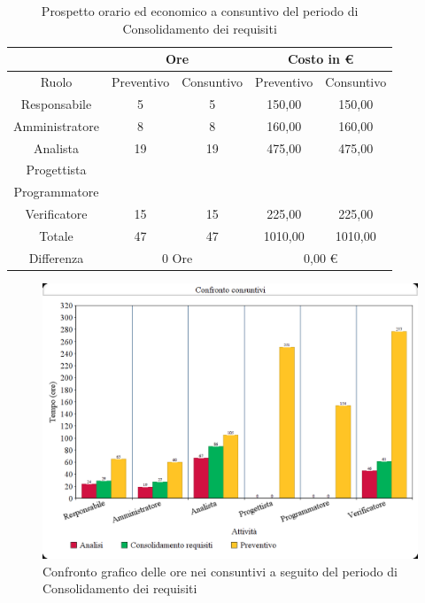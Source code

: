 \documentclass[./PianodiProgetto.tex]{subfiles}
\begin{document}
\begin{table}[H]
	\centering
	\begin{tabular}{|c|c|c|c|c|}
		\hline
		& \multicolumn{2}{c|}{Ore} & \multicolumn{2}{c|}{Costo in \euro{}}  \\ \hline
		Ruolo&Preventivo&Consuntivo&Preventivo&Consuntivo \\ \hline
		Responsabile&5&5&150,00&150,00  \\ \hline
		Amministratore&8&8&160,00&160,00  \\ \hline
		Analista&19&19&475,00&475,00  \\ \hline
		Progettista& & & &  \\ \hline
		Programmatore& & & &  \\ \hline
		Verificatore&15&15&225,00&225,00  \\ \hline
		Totale&47&47&1010,00&1010,00  \\ \hline
		Differenza& \multicolumn{2}{c|}{0 Ore} & \multicolumn{2}{c|}{0,00 \euro{}} \\ \hline
	\end{tabular}
	\caption{Prospetto orario ed economico a consuntivo del periodo di Consolidamento dei requisiti}
\end{table}
\begin{figure}[H]
	\centering
	\includegraphics[width=1\linewidth]{img/grafici/OreConsuntivo/consuntivo-ore-consolidamento_requisiti}
	\caption{Confronto grafico delle ore nei consuntivi a seguito del periodo di Consolidamento dei requisiti}
	\label{fig:consuntivo-ore-consolidamento_requisiti}
\end{figure}
\end{document}
